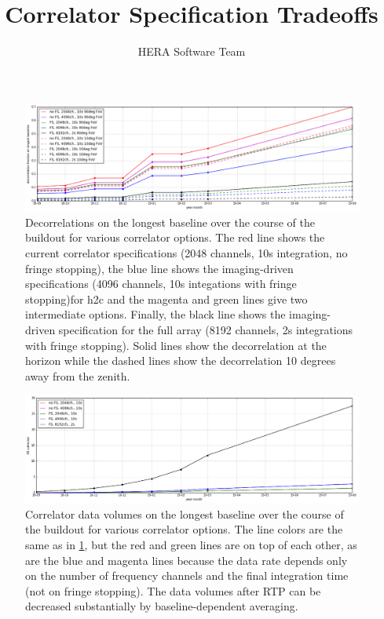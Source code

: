 \documentclass{article}
\begin{document}
\author{HERA Software Team}
\title{Correlator Specification Tradeoffs}
\maketitle




\begin{figure}
\includegraphics[width=\textwidth]{spec_calcs/decorrelation.png} 
\caption{Decorrelations on the longest baseline over the course of the buildout for various correlator options. The red line shows the current correlator specifications (2048 channels, 10s integration, no fringe stopping), the blue line shows the imaging-driven specifications (4096 channels, 10s integations with fringe stopping)for h2c and the magenta and green lines give two intermediate options. Finally, the black line shows the imaging-driven specification for the full array (8192 channels, 2s integrations with fringe stopping). Solid lines show the decorrelation at the horizon while the dashed lines show the decorrelation 10 degrees away from the zenith.}
\label{Fig:decorr}
\end{figure}

\begin{figure}
\includegraphics[width=\textwidth]{spec_calcs/corr_data_vols.png} 
\caption{Correlator data volumes on the longest baseline over the course of the buildout for various correlator options. The line colors are the same as in \ref{Fig:decorr}, but the red and green lines are on top of each other, as are the blue and magenta lines because the data rate depends only on the number of frequency channels and the final integration time (not on fringe stopping). The data volumes after RTP can be decreased substantially by baseline-dependent averaging.}
\label{Fig:corr_vol}
\end{figure}
\end{document}
